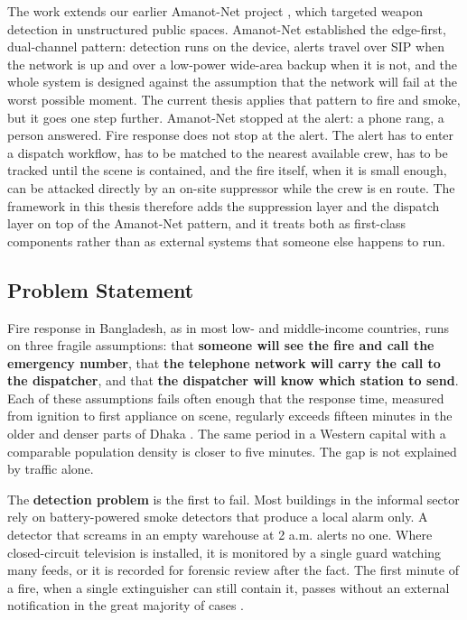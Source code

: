 The work extends our earlier Amanot-Net project \cite{amanotnet2026}, which targeted weapon detection in unstructured public spaces. Amanot-Net established the edge-first, dual-channel pattern: detection runs on the device, alerts travel over SIP when the network is up and over a low-power wide-area backup when it is not, and the whole system is designed against the assumption that the network will fail at the worst possible moment. The current thesis applies that pattern to fire and smoke, but it goes one step further. Amanot-Net stopped at the alert: a phone rang, a person answered. Fire response does not stop at the alert. The alert has to enter a dispatch workflow, has to be matched to the nearest available crew, has to be tracked until the scene is contained, and the fire itself, when it is small enough, can be attacked directly by an on-site suppressor while the crew is en route. The framework in this thesis therefore adds the suppression layer and the dispatch layer on top of the Amanot-Net pattern, and it treats both as first-class components rather than as external systems that someone else happens to run.

\subsection{Problem Statement}

Fire response in Bangladesh, as in most low- and middle-income countries, runs on three fragile assumptions: that \textbf{someone will see the fire and call the emergency number}, that \textbf{the telephone network will carry the call to the dispatcher}, and that \textbf{the dispatcher will know which station to send}. Each of these assumptions fails often enough that the response time, measured from ignition to first appliance on scene, regularly exceeds fifteen minutes in the older and denser parts of Dhaka \cite{fscdAnnual2024,islam2020dhakafire}. The same period in a Western capital with a comparable population density is closer to five minutes. The gap is not explained by traffic alone.

The \textbf{detection problem} is the first to fail. Most buildings in the informal sector rely on battery-powered smoke detectors that produce a local alarm only. A detector that screams in an empty warehouse at 2 a.m. alerts no one. Where closed-circuit television is installed, it is monitored by a single guard watching many feeds, or it is recorded for forensic review after the fact. The first minute of a fire, when a single extinguisher can still contain it, passes without an external notification in the great majority of cases \cite{shidik2019,sreenu2019}.

